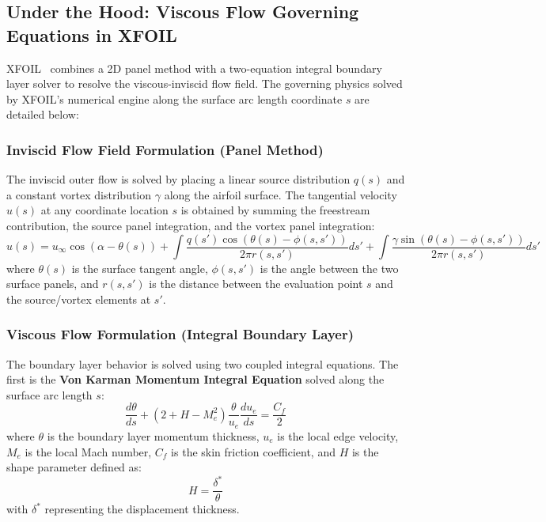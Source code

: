 \documentclass[11pt]{article}
\begin{document}
\subsection{Under the Hood: Viscous Flow Governing Equations in XFOIL}
XFOIL~\cite{drela1989} combines a 2D panel method with a two-equation integral boundary layer solver to resolve the viscous-inviscid flow field. The governing physics solved by XFOIL's numerical engine along the surface arc length coordinate $s$ are detailed below:

\subsubsection{Inviscid Flow Field Formulation (Panel Method)}
The inviscid outer flow is solved by placing a linear source distribution $q(s)$ and a constant vortex distribution $\gamma$ along the airfoil surface. The tangential velocity $u(s)$ at any coordinate location $s$ is obtained by summing the freestream contribution, the source panel integration, and the vortex panel integration:
\begin{equation}
    u(s) = u_{\infty} \cos(\alpha - \theta(s)) + \int \frac{q(s') \cos(\theta(s) - \phi(s,s'))}{2\pi r(s,s')} ds' + \int \frac{\gamma \sin(\theta(s) - \phi(s,s'))}{2\pi r(s,s')} ds'
\end{equation}
where $\theta(s)$ is the surface tangent angle, $\phi(s,s')$ is the angle between the two surface panels, and $r(s,s')$ is the distance between the evaluation point $s$ and the source/vortex elements at $s'$.

\subsubsection{Viscous Flow Formulation (Integral Boundary Layer)}
The boundary layer behavior is solved using two coupled integral equations. The first is the \textbf{Von Karman Momentum Integral Equation} solved along the surface arc length $s$:
\begin{equation}
    \frac{d\theta}{ds} + (2 + H - M_e^2) \frac{\theta}{u_e} \frac{du_e}{ds} = \frac{C_f}{2}
\end{equation}
where $\theta$ is the boundary layer momentum thickness, $u_e$ is the local edge velocity, $M_e$ is the local Mach number, $C_f$ is the skin friction coefficient, and $H$ is the shape parameter defined as:
\begin{equation}
    H = \frac{\delta^*}{\theta}
\end{equation}
with $\delta^*$ representing the displacement thickness.
\end{document}
